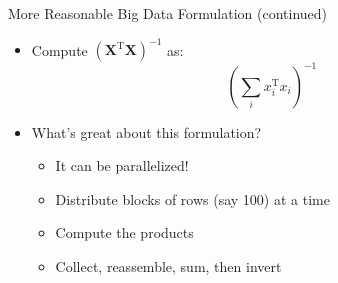 \documentclass[aspectratio=169]{beamer}
\begin{document}
\begin{frame}{More Reasonable Big Data Formulation (continued)}

\begin{itemize}
	\item Compute $(\textbf{X}^{\textrm{T}}\textbf{X})^{-1}$ as:
		$$\left( \sum_i x_i^{\textrm{T}} x_i \right)^{-1}$$
	\item What's great about this formulation?
\begin{itemize}
	\item It can be parallelized!
	\item Distribute blocks  of rows (say 100) at a time
	\item Compute the products
	\item Collect,  reassemble, sum, then invert
\end{itemize}
\end{itemize}
\end{frame}
\end{document}

